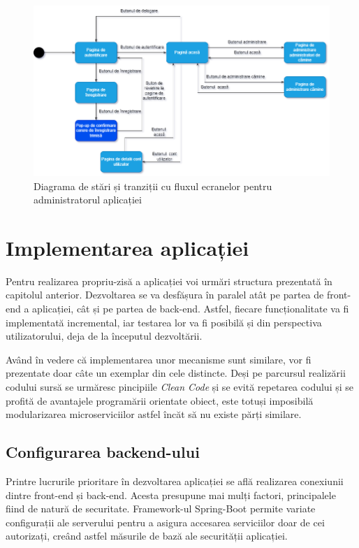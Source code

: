 \documentclass[12pt,a4paper]{report}
\theoremstyle{definition}
\theoremstyle{remark}
\begin{document}
\begin{figure}[H]
    \centering
    \includegraphics[width=0.75\linewidth]{resurse/diagrame/diagrama_de_navigare3.drawio.png}
    \caption{Diagrama de stări și tranziții cu fluxul ecranelor pentru administratorul aplicației}
\end{figure}

\chapter{Implementarea aplicației}
\par Pentru realizarea propriu-zisă a aplicației voi urmări structura prezentată în capitolul anterior. Dezvoltarea se va desfășura în paralel atât pe partea de front-end a aplicației, cât și pe partea de back-end. Astfel, fiecare funcționalitate va fi implementată incremental, iar testarea lor va fi posibilă și din perspectiva utilizatorului, deja de la începutul dezvoltării.

\par Având în vedere că implementarea unor mecanisme sunt similare, vor fi prezentate doar câte un exemplar din cele distincte. Deși pe parcursul realizării codului sursă se urmăresc pincipiile \textit{Clean Code}\cite{martin2009clean} și se evită repetarea codului și se profită de avantajele programării orientate obiect, este totuși imposibilă modularizarea microserviciilor astfel încăt să nu existe părți similare.

\section{Configurarea backend-ului}
\par Printre lucrurile prioritare în dezvoltarea aplicației se află realizarea conexiunii dintre front-end și back-end. Acesta presupune mai mulți factori, principalele fiind de natură de securitate. Framework-ul Spring-Boot permite variate configurații ale serverului pentru a asigura accesarea serviciilor doar de cei autorizați, creând astfel măsurile de bază ale securității aplicației\cite{scarioni2019pro}.
\end{document}
